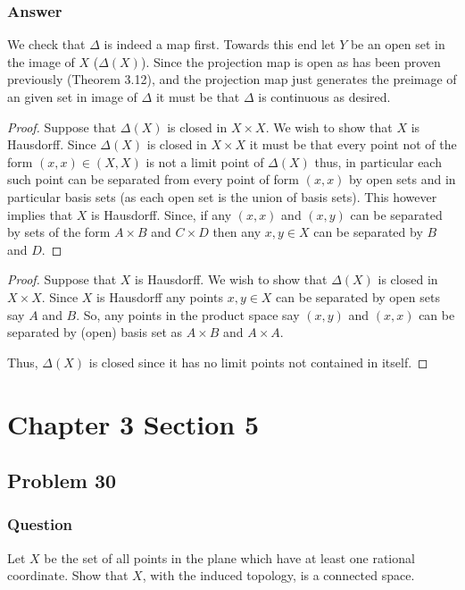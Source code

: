 \documentclass[10pt]{article}
\begin{document}
\subsubsection{Answer}
We check that $\Delta$ is indeed a map first. Towards this end let $Y$ be an open set in the image of $X$ ($\Delta(X)$). Since the projection map is open as has been proven previously (Theorem 3.12), and the projection map just generates the preimage of an given set in image of $\Delta$ it must be that $\Delta$ is continuous as desired.

\begin{proof}
Suppose that $\Delta(X)$ is closed in $X \times X$. We wish to show that $X$ is Hausdorff. Since $\Delta(X)$ is closed in $X \times X$ it must be that every point not of the form $(x,x)\in (X,X)$ is not a limit point of $\Delta(X)$ thus, in particular each such point can be separated from every point of form $(x,x)$ by open sets and in particular basis sets (as each open set is the union of basis sets). This however implies that $X$ is Hausdorff. Since, if any $(x,x)$ and  $(x,y)$ can be separated by sets of the form $A\times B$ and $C\times D$ then any $x,y \in X$ can be separated by $B$ and $D$.
\end{proof}

\begin{proof}
Suppose that $X$ is Hausdorff. We wish to show that $\Delta(X)$ is closed in $X \times X$. Since $X$ is Hausdorff any points $x,y \in X $ can be separated by open sets say $A$ and $B$. So, any points in the product space say $(x,y)$ and $(x,x)$ can be separated by (open) basis set as $A\times B$ and $A \times A$.

Thus, $\Delta(X)$ is closed since it has no limit points not contained in itself.
\end{proof}

\section{Chapter 3 Section 5}


\subsection{Problem 30}

\subsubsection{Question}
Let $X$ be the set of all points in the plane which have at least one rational coordinate. Show that $X$, with the induced topology, is a connected space.
\end{document}
